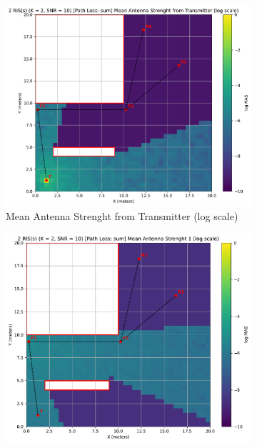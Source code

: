 \begin{figure}[H]
\begin{subfigure}[b]{0.48\textwidth}
    \includegraphics[width=\textwidth]{imgs/heatmap-simulations/2 RIS(s) (K = 2, SNR = 10) [Path Loss: sum] Mean Antenna Strenght from Transmitter (log scale).pdf}
    \caption{Mean Antenna Strenght from Transmitter (log scale)}
  \end{subfigure}
  \medskip
  \centering
  \begin{subfigure}[b]{0.48\textwidth}
    \centering
    \includegraphics[width=\textwidth]{imgs/heatmap-simulations/2 RIS(s) (K = 2, SNR = 10) [Path Loss: sum] Mean Antenna Strenght 1 (log scale).pdf}

\end{subfigure}
\end{figure}
